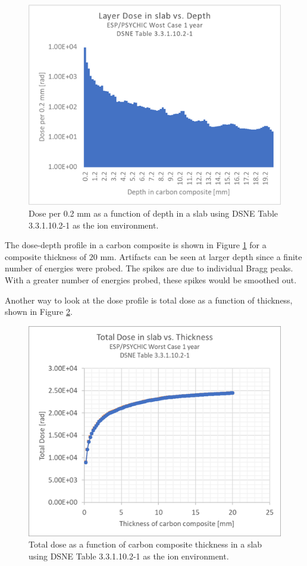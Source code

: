 \documentclass{hitec}
\begin{document}
\begin{figure}[h!]
	\centering
	\includegraphics[scale=0.9]{LayerDoseinSlab_vs_Depth.png}
	\caption{Dose per 0.2 mm as a function of depth in a slab using DSNE Table 3.3.1.10.2-1 as the ion environment.}\label{fig:LayerDoseinSlab_vs_Depth}
\end{figure}

The dose-depth profile in a carbon composite is shown in Figure \ref{fig:LayerDoseinSlab_vs_Depth} for a composite thickness of $20$ mm. Artifacts can be seen at larger depth since a finite number of energies were probed. The spikes are due to individual Bragg peaks. With a greater number of energies probed, these spikes would be smoothed out.

Another way to look at the dose profile is total dose as a function of thickness, shown in Figure \ref{fig:TotalDoseinSlab_vs_Thickness}.

\begin{figure}[h!]
	\centering
	\includegraphics[scale=0.9]{TotalDoseinSlab_vs_Thickness.png}
	\caption{Total dose as a function of carbon composite thickness in a slab using DSNE Table 3.3.1.10.2-1 as the ion environment.}\label{fig:TotalDoseinSlab_vs_Thickness}
\end{figure}
\end{document}
